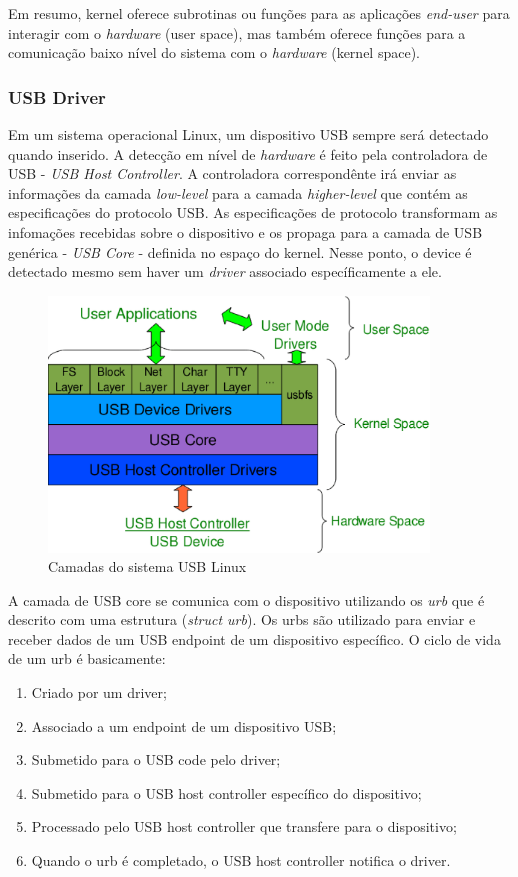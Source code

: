 Em resumo, kernel oferece subrotinas ou funções para as aplicações \textit{end-user} para interagir
com o \textit{hardware} (user space), mas também oferece funções para a comunicação baixo nível do sistema
com o \textit{hardware} (kernel space).

\subsubsection{USB Driver}

Em um sistema operacional Linux, um dispositivo USB sempre será detectado quando inserido.
A detecção em nível de \textit{hardware} é feito pela controladora de USB - \textit{USB Host Controller}. A controladora
correspondênte irá enviar as informações da camada \textit{low-level} para a camada \textit{higher-level} que contém
as especificações do protocolo USB. As especificações de protocolo transformam as infomações recebidas
sobre o dispositivo e os propaga para a camada de USB genérica - \textit{USB Core} - definida no espaço
do kernel. Nesse ponto, o device é detectado mesmo sem haver um \textit{driver} associado específicamente a ele.

\begin{figure}[H]
  \centering
  \caption{Camadas do sistema USB Linux}
  \label{fig:usblinux}
  \includegraphics[width=0.9\textwidth]{figure/usbgeral.eps}
\end{figure}

A camada de USB core se comunica com o dispositivo utilizando os \textit{urb} que é descrito com uma estrutura
(\textit{struct urb}). Os urbs são utilizado para enviar e receber dados de um USB endpoint de um
dispositivo específico. O ciclo de vida de um urb é basicamente:
\begin{enumerate}
  \item Criado por um driver;
  \item Associado a um endpoint de um dispositivo USB;
  \item Submetido para o USB code pelo driver;
  \item Submetido para o USB host controller específico do dispositivo;
  \item Processado pelo USB host controller que transfere para o dispositivo;
  \item Quando o urb é completado, o USB host controller notifica o driver.
\end{enumerate}

